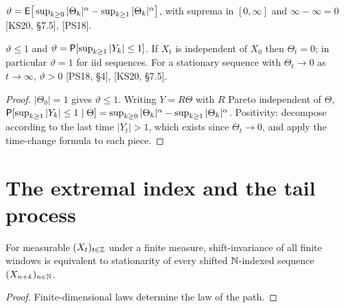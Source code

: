 \begin{definition}
  \label{def:candidate-extremal-index}
  \leanok
  $\vartheta = \mathsf{E}\big[\sup_{k \ge 0} |\Theta_k|^\alpha - \sup_{k \ge 1} |\Theta_k|^\alpha\big]$, with
  suprema in $[0, \infty]$ and $\infty - \infty = 0$ [KS20, \S7.5], [PS18].
\end{definition}

\begin{theorem}
  \label{thm:candidate-extremal-index}
  \leanok
  $\vartheta \le 1$ and $\vartheta = \mathsf{P}[\sup_{k \ge 1} |Y_k| \le 1]$. If $X_t$ is independent of $X_0$
  then $\Theta_t = 0$; in particular $\vartheta = 1$ for iid sequences. For a stationary sequence
  with $\Theta_t \to 0$ as $t \to \infty$, $\vartheta > 0$ [PS18, \S4], [KS20, \S7.5].
\end{theorem}
\begin{proof}
  \leanok
  $|\Theta_0| = 1$ gives $\vartheta \le 1$. Writing $Y = R\Theta$ with $R$ Pareto independent of
  $\Theta$, $\mathsf{P}[\sup_{k\ge1}|Y_k| \le 1 \mid \Theta] = \sup_{k\ge0}|\Theta_k|^\alpha -
  \sup_{k\ge1}|\Theta_k|^\alpha$. Positivity: decompose according to the last time $|Y_t| > 1$, which
  exists since $\Theta_t \to 0$, and apply the time-change formula to each piece.
\end{proof}

\section{The extremal index and the tail process}

\begin{lemma}
  \label{lem:stationary-windows}
  \leanok
  For measurable $(X_t)_{t \in \mathbb{Z}}$ under a finite measure, shift-invariance of all finite windows is
  equivalent to stationarity of every shifted $\mathbb{N}$-indexed sequence $(X_{n+k})_{n \in \mathbb{N}}$.
\end{lemma}
\begin{proof}
  \leanok
  Finite-dimensional laws determine the law of the path.
\end{proof}

